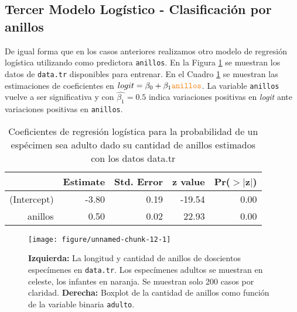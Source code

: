 \documentclass[a4paper]{article}\usepackage[]{graphicx}\usepackage[]{color}
\makeatletter
\def\maxwidth{ %
  \ifdim\Gin@nat@width>\linewidth
    \linewidth
  \else
    \Gin@nat@width
  \fi
}
\newenvironment{knitrout}{}{} %
\makeatother
\begin{document}
\subsection{Tercer Modelo Logístico - Clasificación por anillos}

De igual forma que en los casos anteriores realizamos otro modelo de regresión logística utilizando como predictora \texttt{\textcolor{BurntOrange}{anillos}}. En la Figura \ref{fig:data3} se muestran los datos de \texttt{\textcolor{BurntOrange}{data.tr}} disponibles para entrenar. En el Cuadro \ref{tab:model3} se muestran las estimaciones de coeficientes en $logit = \beta_0 + \beta_1\texttt{\textcolor{BurntOrange}{anillos}}$. La variable \texttt{\textcolor{BurntOrange}{anillos}} vuelve a ser significativa y con $\hat{\beta_1}=0.5$ indica variaciones positivas en \textit{logit} ante variaciones positivas en \texttt{\textcolor{BurntOrange}{anillos}}.

\begin{table}[ht]
\centering
\begin{tabular}{rrrrr}
  \hline
 & Estimate & Std. Error & z value & Pr($>$$|$z$|$) \\ 
  \hline
(Intercept) & -3.80 & 0.19 & -19.54 & 0.00 \\ 
  anillos & 0.50 & 0.02 & 22.93 & 0.00 \\ 
   \hline
\end{tabular}
\caption{Coeficientes de regresión logística para la probabilidad de un espécimen sea adulto dado su cantidad de anillos estimados con los datos data.tr} 
\label{tab:model3}
\end{table}


\begin{figure}[H]
\caption{\textbf{Izquierda:} La longitud y cantidad de anillos de doscientos especímenes en \texttt{\textcolor{BurntOrange}{data.tr}}. Los especímenes adultos se muestran en celeste, los infantes en naranja. Se muestran solo 200 casos por claridad. \textbf{Derecha:} Boxplot de la cantidad de anillos como función de la variable binaria \texttt{\textcolor{BurntOrange}{adulto}}.}
\label{fig:data3}
\begin{knitrout}
\color{fgcolor}

{\centering \texttt{[image: figure/unnamed-chunk-12-1]} 

}



\end{knitrout}

\end{figure}
\end{document}
